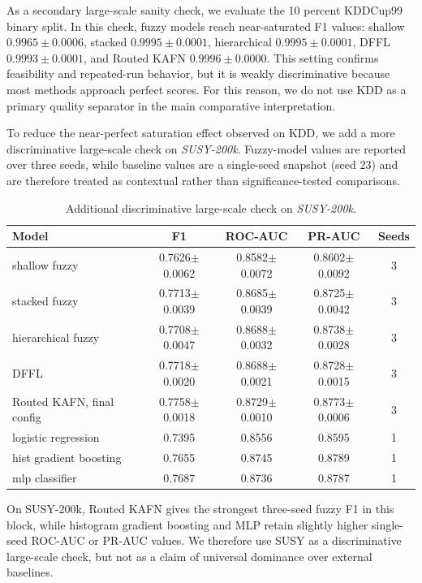 \documentclass[runningheads]{llncs}
\begin{document}
As a secondary large-scale sanity check, we evaluate the 10 percent KDDCup99 binary split. In this check, fuzzy models reach near-saturated F1 values: shallow $0.9965\pm0.0006$, stacked $0.9995\pm0.0001$, hierarchical $0.9995\pm0.0001$, DFFL $0.9993\pm0.0001$, and Routed KAFN $0.9996\pm0.0000$. This setting confirms feasibility and repeated-run behavior, but it is weakly discriminative because most methods approach perfect scores. For this reason, we do not use KDD as a primary quality separator in the main comparative interpretation.

To reduce the near-perfect saturation effect observed on KDD, we add a more discriminative large-scale check on \textit{SUSY-200k}. Fuzzy-model values are reported over three seeds, while baseline values are a single-seed snapshot (seed 23) and are therefore treated as contextual rather than significance-tested comparisons.

\begin{table}[H]
\centering
\caption{Additional discriminative large-scale check on \textit{SUSY-200k}.}
\label{tab:susy_discriminative}
\scriptsize
\setlength{\tabcolsep}{4pt}
\begin{tabular}{lcccc}
\toprule
Model & F1 & ROC-AUC & PR-AUC & Seeds \\
\midrule
shallow fuzzy & 0.7626$\pm$0.0062 & 0.8582$\pm$0.0072 & 0.8602$\pm$0.0092 & 3 \\
stacked fuzzy & 0.7713$\pm$0.0039 & 0.8685$\pm$0.0039 & 0.8725$\pm$0.0042 & 3 \\
hierarchical fuzzy & 0.7708$\pm$0.0047 & 0.8688$\pm$0.0032 & 0.8738$\pm$0.0028 & 3 \\
DFFL & 0.7718$\pm$0.0020 & 0.8688$\pm$0.0021 & 0.8728$\pm$0.0015 & 3 \\
Routed KAFN, final config & 0.7758$\pm$0.0018 & 0.8729$\pm$0.0010 & 0.8773$\pm$0.0006 & 3 \\
logistic regression & 0.7395 & 0.8556 & 0.8595 & 1 \\
hist gradient boosting & 0.7655 & 0.8745 & 0.8789 & 1 \\
mlp classifier & 0.7687 & 0.8736 & 0.8787 & 1 \\
\bottomrule
\end{tabular}
\end{table}

On SUSY-200k, Routed KAFN gives the strongest three-seed fuzzy F1 in this block, while histogram gradient boosting and MLP retain slightly higher single-seed ROC-AUC or PR-AUC values. We therefore use SUSY as a discriminative large-scale check, but not as a claim of universal dominance over external baselines.
\end{document}
